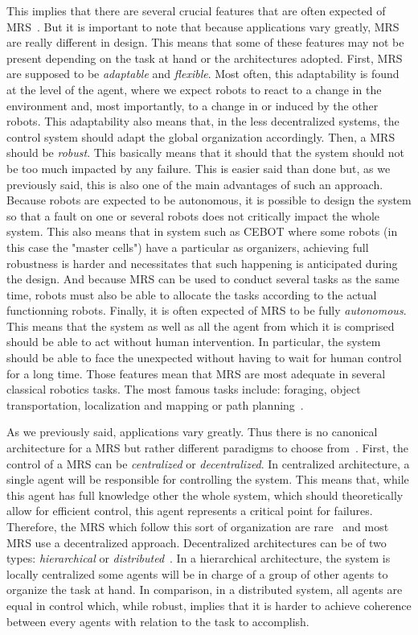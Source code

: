     This implies that there are several crucial features that are often expected of MRS~\parencite{Parker1994}. But it is important to note that because applications vary greatly, MRS are really different in design. This means that some of these features may not be present depending on the task at hand or the architectures adopted. First, MRS are supposed to be \emph{adaptable} and \emph{flexible}. Most often, this adaptability is found at the level of the agent, where we expect robots to react to a change in the environment and, most importantly, to a change in or induced by the other robots. This adaptability also means that, in the less decentralized systems, the control system should adapt the global organization accordingly. Then, a MRS should be \emph{robust}. This basically means that it should that the system should not be too much impacted by any failure. This is easier said than done but, as we previously said, this is also one of the main advantages of such an approach. Because robots are expected to be autonomous, it is possible to design the system so that a fault on one or several robots does not critically impact the whole system. This also means that in system such as CEBOT where some robots (in this case the "master cells") have a particular as organizers, achieving full robustness is harder and necessitates that such happening is anticipated during the design. And because MRS can be used to conduct several tasks as the same time, robots must also be able to allocate the tasks according to the actual functionning robots. Finally, it is often expected of MRS to be fully \emph{autonomous}. This means that the system as well as all the agent from which it is comprised should be able to act without human intervention. In particular, the system should be able to face the unexpected without having to wait for human control for a long time. Those features mean that MRS are most adequate in several classical robotics tasks. The most famous tasks include: foraging, object transportation, localization and mapping or path planning~\parencite{Farinelli2004}.

    As we previously said, applications vary greatly. Thus there is no canonical architecture for a MRS but rather different paradigms to choose from~\parencite{Cao1997, Parker2008}. First, the control of a MRS can be \emph{centralized} or \emph{decentralized}. In centralized architecture, a single agent will be responsible for controlling the system. This means that, while this agent has full knowledge other the whole system, which should theoretically allow for efficient control, this agent represents a critical point for failures. Therefore, the MRS which follow this sort of organization are rare~\parencite{Parker2008} and most MRS use a decentralized approach. Decentralized architectures can be of two types: \emph{hierarchical} or \emph{distributed}~\parencite{Cao1997}. In a hierarchical architecture, the system is locally centralized some agents will be in charge of a group of other agents to organize the task at hand. In comparison, in a distributed system, all agents are equal in control which, while robust, implies that it is harder to achieve coherence between every agents with relation to the task to accomplish.

